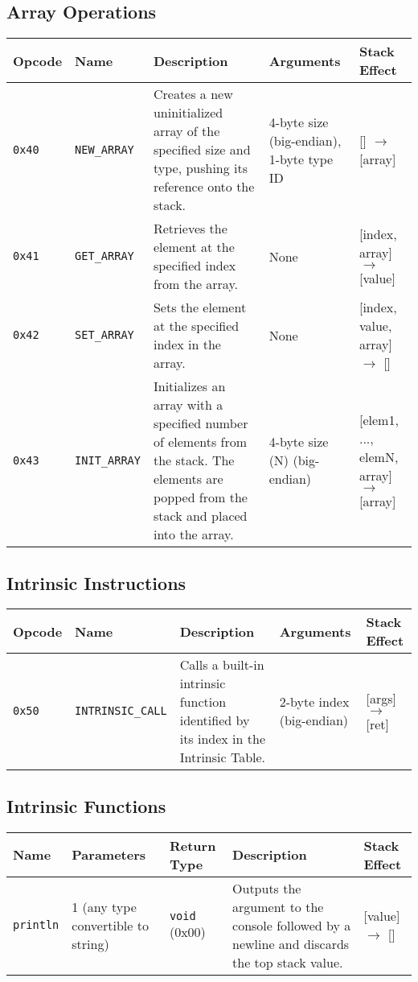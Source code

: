 \documentclass[a4paper,12pt]{article}
\begin{document}
    \subsection{Array Operations}
    \begin{tabular}{|l|l|p{4cm}|p{4cm}|p{4cm}|}
        \hline
        \textbf{Opcode} & \textbf{Name} & \textbf{Description} & \textbf{Arguments} & \textbf{Stack Effect} \\ \hline
        \texttt{0x40} & \texttt{NEW\_ARRAY} & Creates a new uninitialized array of the specified size and type, pushing its reference onto the stack. & 4-byte size (big-endian), 1-byte type ID & [] $\rightarrow$ [array] \\ \hline
        \texttt{0x41} & \texttt{GET\_ARRAY} & Retrieves the element at the specified index from the array. & None & [index, array] $\rightarrow$ [value] \\ \hline
        \texttt{0x42} & \texttt{SET\_ARRAY} & Sets the element at the specified index in the array. & None & [index, value, array] $\rightarrow$ [] \\ \hline
        \texttt{0x43} & \texttt{INIT\_ARRAY} & Initializes an array with a specified number of elements from the stack. The elements are popped from the stack and placed into the array. & 4-byte size (N) (big-endian) & [elem1, ..., elemN, array] $\rightarrow$ [array] \\ \hline
    \end{tabular}
    \label{tab:array_operations}

    \subsection{Intrinsic Instructions}
    \begin{tabular}{|l|l|p{4cm}|l|l|}
        \hline
        \textbf{Opcode} & \textbf{Name} & \textbf{Description} & \textbf{Arguments} & \textbf{Stack Effect} \\ \hline
        \texttt{0x50} & \texttt{INTRINSIC\_CALL} & Calls a built-in intrinsic function identified by its index in the Intrinsic Table. & 2-byte index (big-endian) & [args] $\rightarrow$ [ret] \\ \hline
    \end{tabular}
    \label{tab:intrinsic_instructions}

    \subsection{Intrinsic Functions}
    \begin{tabular}{|l|l|l|p{4cm}|l|}
        \hline
        \textbf{Name} & \textbf{Parameters} & \textbf{Return Type} & \textbf{Description} & \textbf{Stack Effect} \\ \hline
        \texttt{println} & 1 (any type convertible to string) & \texttt{void} (0x00) & Outputs the argument to the console followed by a newline and discards the top stack value. & [value] $\rightarrow$ [] \\ \hline
    \end{tabular}
    \label{tab:intrinsic_functions}
\end{document}

